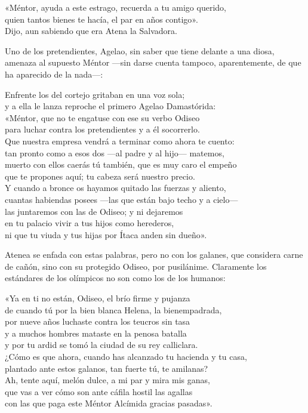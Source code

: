 \begin{versocita}
«Méntor, ayuda a este estrago, recuerda a tu amigo querido,\\
quien tantos bienes te hacía, el par en años contigo».\\
Dijo, aun sabiendo que era Atena la Salvadora.
\end{versocita}

Uno de los pretendientes, Agelao, sin saber que tiene delante a una diosa, amenaza al supuesto Méntor ---sin darse cuenta tampoco, aparentemente, de que ha aparecido de la nada---:

\begin{versocita}
Enfrente los del cortejo gritaban en una voz sola;\\
y a ella le lanza reproche el primero Agelao Damastórida:\\
«Méntor, que no te engatuse con ese su verbo Odiseo\\
para luchar contra los pretendientes y a él socorrerlo.\\
Que nuestra empresa vendrá a terminar como ahora te cuento:\\
tan pronto como a esos dos ---al padre y al hijo--- matemos,\\
muerto con ellos caerás tú también, que es muy caro el empeño\\
que te propones aquí; tu cabeza será nuestro precio.\\
Y cuando a bronce os hayamos quitado las fuerzas y aliento,\\
cuantas habiendas posees ---las que están bajo techo y a cielo---\\
las juntaremos con las de Odiseo; y ni dejaremos\\
en tu palacio vivir a tus hijos como herederos,\\
ni que tu viuda y tus hijas por Ítaca anden sin dueño».
\end{versocita}

Atenea se enfada con estas palabras, pero no con los galanes, que considera carne de cañón, sino con su protegido Odiseo, por pusilánime. Claramente los estándares de los olímpicos no son como los de los humanos:

\begin{versocita}
«Ya en ti no están, Odiseo, el brío firme y pujanza\\
de cuando tú por la bien blanca Helena, la bienempadrada,\\
por nueve años luchaste contra los teucros sin tasa\\
y a muchos hombres mataste en la penosa batalla\\
y por tu ardid se tomó la ciudad de su rey calliclara.\\
¿Cómo es que ahora, cuando has alcanzado tu hacienda y tu casa,\\
plantado ante estos galanos, tan fuerte tú, te amilanas?\\
Ah, tente aquí, melón dulce, a mi par y mira mis ganas,\\
que vas a ver cómo son ante cáfila hostil las agallas\\
con las que paga este Méntor Alcímida gracias pasadas».
\end{versocita}

